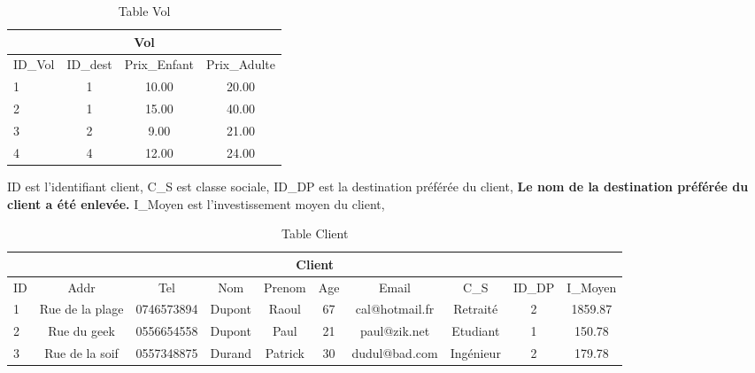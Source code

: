 \begin{table}[h]
\begin{center}
\begin{tabular}{|l|c|c|c|}
\hline
\multicolumn{4}{|c|}{Vol}\\
\hline
ID\_Vol& ID\_dest & Prix\_Enfant& Prix\_Adulte\\
\hline
1 & 1& 10.00 & 20.00\\
\hline
2 & 1& 15.00& 40.00\\
\hline
3 & 2& 9.00& 21.00\\
\hline
4 & 4& 12.00& 24.00\\
\hline
\end{tabular}
\end{center}
\caption{Table Vol}
\end{table}


\begin{table}[h]
ID est l'identifiant client,
C\_S est classe sociale,
ID\_DP est la destination pr\'ef\'er\'ee du client,
\textbf{Le nom de la destination pr\'ef\'er\'ee du client a \'et\'e enlev\'ee.}
I\_Moyen est l'investissement moyen du client,
\bigskip

\small \begin{tabular}{|l|c|c|c|c|c|c|c|c|c|}
\hline
\multicolumn{10}{|c|}{Client}\\
\hline
ID& Addr& Tel & Nom & Prenom & Age & Email&C\_S & ID\_DP &I\_Moyen\\
\hline
1 &Rue de la plage&0746573894&Dupont&Raoul&67 &cal@hotmail.fr&Retrait\'e&2&1859.87\\
\hline
2 &Rue du geek&0556654558&Dupont&Paul&21 &paul@zik.net&Etudiant&1&150.78\\
\hline
3 &Rue de la soif&0557348875&Durand&Patrick&30 &dudul@bad.com&Ing\'enieur&2&179.78\\
\hline
\end{tabular}
\caption{Table Client}
\end{table}


